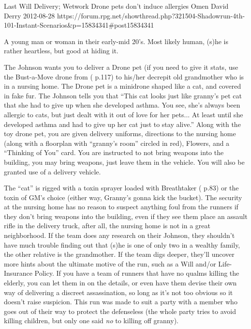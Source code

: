 \begin{scenario}{Last Will}
	{Delivery; Wetwork}
	{Drone pets don't induce allergies}
	{Omen David Derry}
	{2012-08-28}
	{https://forum.rpg.net/showthread.php?321504-Shadowrun-4th-101-Instant-Scenarios\&p=15834341#post15834341}

  A young man or woman in their early-mid 20's. Most likely human, (s)he is rather heartless, but good at hiding it.

\synopsis The Johnson wants you to deliver a Drone pet (if you need to give it stats, use the Bust-a-Move drone from ( p.117) to his/her decrepit old grandmother who is in a nursing home. The Drone pet is a minidrone shaped like a cat, and covered in fake fur. The Johnson tells you that ``This cat looks just like granny's pet cat that she had to give up when she developed asthma. You see, she's always been allergic to cats, but just dealt with it out of love for her pets... At least until she developed asthma and had to give up her cat just to stay alive.'' Along with the toy drone pet, you are given delivery uniforms, directions to the nursing home (along with a floorplan with ``granny's room'' circled in red), Flowers, and a ``Thinking of You'' card. You are instructed to not bring weapons into the building, you may bring weapons, just leave them in the vehicle. You will also be granted use of a delivery vehicle.

\notes 
    The ``cat'' is rigged with a toxin sprayer loaded with Breathtaker ( p.83) or the toxin of GM's choice (either way, Granny's gonna kick the bucket). The security at the nursing home has no reason to suspect anything foul from the runners if they don't bring weapons into the building, even if they see them place an assault rifle in the delivery truck, after all, the nursing home is not in a great neighborhood. If the team does any research on their Johnson, they shouldn't have much trouble finding out that (s)he is one of only two in a wealthy family, the other relative is the grandmother. If the team digs deeper, they'll uncover more hints about the ultimate motive of the run, such as a Will and/or Life-Insurance Policy. If you have a team of runners that have no qualms killing the elderly, you can let them in on the details, or even have them devise their own way of delivering a discreet assassination, so long as it's not too obvious so it doesn't raise suspicion. This run was made to suit a party with a member who goes out of their way to protect the defenseless (the whole party tries to avoid killing children, but only one said \textit{no} to killing off granny). 


\end{scenario}